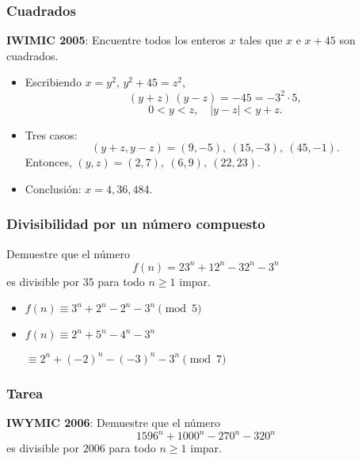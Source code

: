 \documentclass[handout]{beamer}
\begin{document}
\begin{frame}[fragile]
  \frametitle{Cuadrados}

  \begin{shaded}
    \textbf{IWIMIC 2005}: Encuentre todos los enteros $x$ tales que $x$ e $x+45$
    son cuadrados.
  \end{shaded}

  \ifdefined\solutions

  \begin{itemize}
  \item<3-> Escribiendo $x = y^2$, $y^2 + 45 = z^2$,
  \[ (y + z)\,(y - z) = -45 = -3^2\cdot 5, \]
  \[
    0 < y < z, \quad
    |y-z| < y + z.
  \]

  \item<4-> Tres casos:
  \[ (y+z, y-z) = (9,-5), ~ (15,-3), ~ (45,-1). \]
  Entonces, $(y,z) = (2,7), ~ (6,9), ~ (22,23)$.

  \item<5-> Conclusión: $x = 4, 36, 484$.
  \end{itemize}
  \fi
\end{frame}


\begin{frame}[fragile]
  \frametitle{Divisibilidad por un número compuesto}

  \begin{shaded}
    Demuestre que el número
    $$f(n) = 23^n + 12^n - 32^n - 3^n$$
    es divisible por $35$ para todo $n \ge 1$ impar.
  \end{shaded}

  \ifdefined\solutions

  \begin{itemize}
  \item<3-> $f (n) \equiv 3^n + 2^n - 2^n - 3^n \pmod{5}$

  \item<4-> $f (n) \equiv 2^n + 5^n - 4^n - 3^n$

    \hspace{1.9em}$\equiv 2^n + (-2)^n - (-3)^n - 3^n \pmod{7}$
  \end{itemize}
  \fi
\end{frame}


\begin{frame}
  \frametitle{Tarea}

  \begin{shaded}
    \textbf{IWYMIC 2006}: Demuestre que el número
    $$1596^n + 1000^n - 270^n - 320^n$$
    es divisible por $2006$ para todo $n \ge 1$ impar.
  \end{shaded}
\end{frame}
\end{document}
